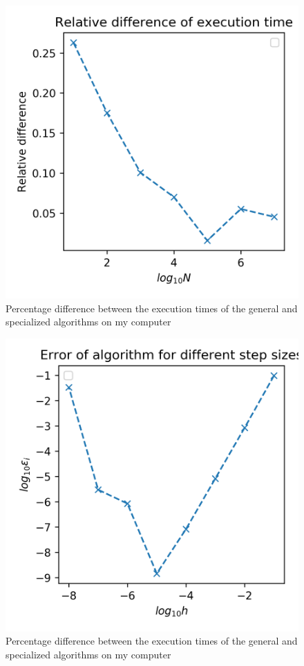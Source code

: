 \documentclass[10pt,showpacs,preprintnumbers,footinbib,amsmath,amssymb,aps,prl,twocolumn,groupedaddress,superscriptaddress,showkeys]{revtex4-1}
\begin{document}
  \begin{figure}[hbtp]
    \center
    \includegraphics[scale=.7]{figs/ex1d_timediff.png}
    \caption{Percentage difference between the execution times of the general and specialized algorithms on my computer}
  \end{figure}

  \begin{figure}[hbtp]
    \center
    \includegraphics[scale=.7]{figs/ex1e_err.png}
    \caption{Percentage difference between the execution times of the general and specialized algorithms on my computer}
  \end{figure}
\end{document}
